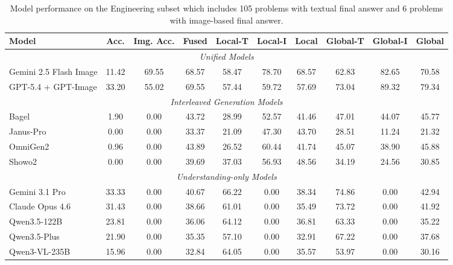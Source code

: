 \documentclass[11pt]{article}
\begin{document}
\begin{table}[!t]
  \centering
  \small
  \begin{tabular}{lccccccccc}
    \toprule
    Model & Acc. & Img. Acc. & Fused & Local-T & Local-I & Local & Global-T & Global-I & Global \\
    \midrule
    \multicolumn{10}{c}{\textit{Unified Models}} \\
    \midrule
    Gemini 2.5 Flash Image & 11.42 & 69.55 & 68.57 & 58.47 & 78.70 & 68.57 & 62.83 & 82.65 & 70.58 \\
    GPT-5.4 + GPT-Image & 33.20 & 55.02 & 69.55 & 57.44 & 59.72 & 57.69 & 73.04 & 89.32 & 79.34 \\
    \midrule
    \multicolumn{10}{c}{\textit{Interleaved Generation Models}} \\
    \midrule
    Bagel & 1.90 & 0.00 & 43.72 & 28.99 & 52.57 & 41.46 & 47.01 & 44.07 & 45.77 \\
    Janus-Pro & 0.00 & 0.00 & 33.37 & 21.09 & 47.30 & 43.70 & 28.51 & 11.24 & 21.32 \\
    OmniGen2 & 0.96 & 0.00 & 43.89 & 26.52 & 60.44 & 41.74 & 45.07 & 38.90 & 45.88 \\
    Showo2 & 0.00 & 0.00 & 39.69 & 37.03 & 56.93 & 48.56 & 34.19 & 24.56 & 30.85 \\
    \midrule
    \multicolumn{10}{c}{\textit{Understanding-only Models}} \\
    \midrule
    Gemini 3.1 Pro & 33.33 & 0.00 & 40.67 & 66.22 & 0.00 & 38.34 & 74.86 & 0.00 & 42.94 \\
    Claude Opus 4.6 & 31.43 & 0.00 & 38.66 & 61.01 & 0.00 & 35.49 & 73.72 & 0.00 & 41.92 \\
    Qwen3.5-122B & 23.81 & 0.00 & 36.06 & 64.12 & 0.00 & 36.81 & 63.33 & 0.00 & 35.22 \\
    Qwen3.5-Plus & 21.90 & 0.00 & 35.35 & 57.10 & 0.00 & 32.91 & 67.22 & 0.00 & 37.68 \\
    Qwen3-VL-235B & 15.96 & 0.00 & 32.84 & 64.05 & 0.00 & 35.57 & 53.97 & 0.00 & 30.16 \\
    \bottomrule
  \end{tabular}
  \caption{Model performance on the Engineering subset which includes 105 problems with textual final answer and 6 problems with image-based final answer.}
  \label{tab:domain_eng_metrics}
\end{table}
\end{document}
